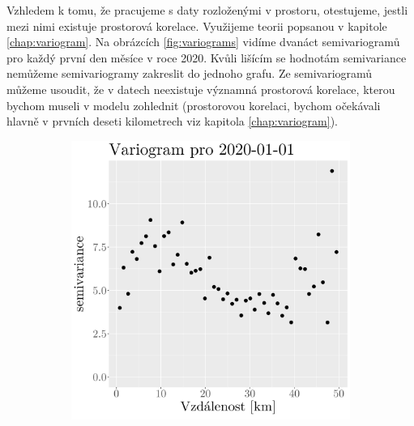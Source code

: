 Vzhledem k tomu, že pracujeme s daty rozloženými v prostoru, otestujeme, jestli mezi nimi existuje prostorová korelace. Využijeme teorii popsanou v kapitole \ref{chap:variogram}. Na obrázcích \ref{fig:variograms} vidíme dvanáct semivariogramů pro každý první den měsíce v roce 2020. Kvůli lišícím se hodnotám semivariance nemůžeme semivariogramy zakreslit do jednoho grafu. Ze semivariogramů můžeme usoudit, že v datech neexistuje významná prostorová korelace, kterou bychom museli v modelu zohlednit (prostorovou korelaci, bychom očekávali hlavně v prvních deseti kilometrech viz kapitola \ref{chap:variogram}).

\begin{figure}
	\centering
	\begin{subfigure}{0.30\textwidth}
		\includegraphics[width=\textwidth]{img/ch2/variograms/variogram_max15cm1.png}
		\caption{}
		\label{fig:variogram1}
	\end{subfigure}
	\hfill
	\begin{subfigure}{0.30\textwidth}

\end{subfigure}
\end{figure}

